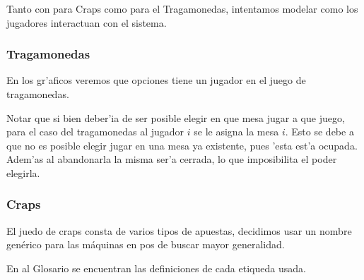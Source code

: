 
\newcommand{\ronda}{ \italica{ FSM Ronda} }
\newcommand{\crupier}{ \italica{ FSM Crupier} }
\newcommand{\tirador}{ \italica{ FSM tirador i} }
\newcommand{\unaRonda}{\italica{FSM Jugador i haciendo apuestas de \textbf{una ronda}}}
\newcommand{\muchasRondas}{\italica{FSM Jugador i haciendo apuestas en\textbf{ m'as de una ronda}}}
\newcommand{\unTiro}{\italica{FSM Jugador i haciendo apuestas de \textbf{un tiro}}}
Tanto con para Craps como para el Tragamonedas, intentamos modelar como los jugadores interactuan con el sistema.

\subsubsection{Tragamonedas}

En los gr'aficos veremos que opciones tiene un jugador en el juego de tragamonedas.

Notar que si bien deber'ia de ser posible elegir en que mesa jugar a que juego, para el caso del tragamonedas al jugador $i$ se le asigna la mesa $i$. Esto se debe a que no es posible elegir jugar en una mesa ya existente, pues 'esta est'a ocupada. Adem'as al abandonarla la misma ser'a cerrada, lo que imposibilita el poder elegirla.

\clearpage


\subsubsection{Craps}

El juedo de craps consta de varios tipos de apuestas, decidimos usar
un nombre genérico para las máquinas en pos de buscar mayor generalidad.

En al Glosario se encuentran las definiciones de cada etiqueda usada.



